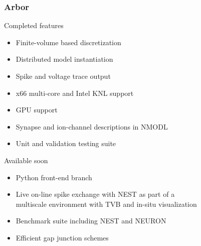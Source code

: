 \documentclass[aspectratio=43,12pt]{beamer}
\newcommand{\arbor}{Arbor}
\begin{document}
\begin{frame}[shrink]
\frametitle{\hspace{-0.5cm}\arbor}
\vspace{0.2\baselineskip}
\textcolor{cscsblue}{Completed features}
\begin{itemize}
\item Finite-volume based discretization
\item Distributed model instantiation
\item Spike and voltage trace output
\item x66 multi-core and Intel KNL support
\item GPU support
\item Synapse and ion-channel descriptions in NMODL
\item Unit and validation testing suite
\end{itemize}

\textcolor{cscsblue}{Available soon}
\begin{itemize}
\item Python front-end branch
\item Live on-line spike exchange with NEST as part of a\\multiscale environment with TVB and in-situ visualization
\item Benchmark suite including NEST and NEURON
\item Efficient gap junction schemes
\end{itemize}
\vfill
\end{frame}
\end{document}
